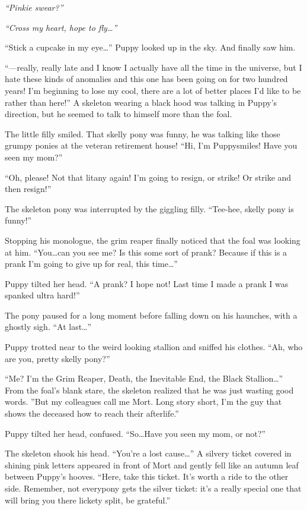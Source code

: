 \emph{``Pinkie swear?''}

\emph{``Cross my heart, hope to fly\dots''}

``Stick a cupcake in my eye\dots'' Puppy looked up in the sky. And finally saw him.

``---really, really late and I know I actually have all the time in the universe, but I hate these kinds of anomalies and this one has been going on for two hundred years! I'm beginning to lose my cool, there are a lot of better places I'd like to be rather than here!'' A skeleton wearing a black hood was talking in Puppy's direction, but he seemed to talk to himself more than the foal.

The little filly smiled. That skelly pony was funny, he was talking like those grumpy ponies at the veteran retirement house! ``Hi, I'm Puppysmiles! Have you seen my mom?''

``Oh, please! Not that litany again! I'm going to resign, or strike! Or strike and then resign!''

The skeleton pony was interrupted by the giggling filly. ``Tee-hee, skelly pony is funny!''

Stopping his monologue, the grim reaper finally noticed that the foal was looking at him. ``You\dots can you see me? Is this some sort of prank? Because if this is a prank I'm going to give up for real, this time\dots''

Puppy tilted her head. ``A prank? I hope not! Last time I made a prank I was spanked ultra hard!''

The pony paused for a long moment before falling down on his haunches, with a ghostly sigh. ``At last\dots''

Puppy trotted near to the weird looking stallion and sniffed his clothes. ``Ah, who are you, pretty skelly pony?''

``Me? I'm the Grim Reaper, Death, the Inevitable End, the Black Stallion\dots'' From the foal's blank stare, the skeleton realized that he was just wasting good words. ''But my colleagues call me Mort. Long story short, I'm the guy that shows the deceased how to reach their afterlife.''

Puppy tilted her head, confused. ``So\dots Have you seen my mom, or not?''

The skeleton shook his head. ``You're a lost cause\dots'' A silvery ticket covered in shining pink letters appeared in front of Mort and gently fell like an autumn leaf between Puppy's hooves. ``Here, take this ticket. It's worth a ride to the other side. Remember, not everypony gets the silver ticket: it's a really special one that will bring you there lickety split, be grateful.''

